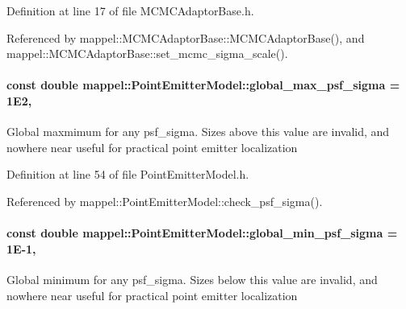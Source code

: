 Definition at line 17 of file M\+C\+M\+C\+Adaptor\+Base.\+h.



Referenced by mappel\+::\+M\+C\+M\+C\+Adaptor\+Base\+::\+M\+C\+M\+C\+Adaptor\+Base(), and mappel\+::\+M\+C\+M\+C\+Adaptor\+Base\+::set\+\_\+mcmc\+\_\+sigma\+\_\+scale().

\paragraph[{\texorpdfstring{global\+\_\+max\+\_\+psf\+\_\+sigma}{global_max_psf_sigma}}]{\setlength{\rightskip}{0pt plus 5cm}const double mappel\+::\+Point\+Emitter\+Model\+::global\+\_\+max\+\_\+psf\+\_\+sigma = 1\+E2\hspace{0.3cm}{\ttfamily [static]}, {\ttfamily [inherited]}}\hypertarget{classmappel_1_1PointEmitterModel_a5e79dba8966c25c4e9c675cd1a2cab70}{}\label{classmappel_1_1PointEmitterModel_a5e79dba8966c25c4e9c675cd1a2cab70}
Global maxmimum for any psf\+\_\+sigma. Sizes above this value are invalid, and nowhere near useful for practical point emitter localization 

Definition at line 54 of file Point\+Emitter\+Model.\+h.



Referenced by mappel\+::\+Point\+Emitter\+Model\+::check\+\_\+psf\+\_\+sigma().

\paragraph[{\texorpdfstring{global\+\_\+min\+\_\+psf\+\_\+sigma}{global_min_psf_sigma}}]{\setlength{\rightskip}{0pt plus 5cm}const double mappel\+::\+Point\+Emitter\+Model\+::global\+\_\+min\+\_\+psf\+\_\+sigma = 1\+E-\/1\hspace{0.3cm}{\ttfamily [static]}, {\ttfamily [inherited]}}\hypertarget{classmappel_1_1PointEmitterModel_a77d0ca98d77cb8b94117ece2a5b182a4}{}\label{classmappel_1_1PointEmitterModel_a77d0ca98d77cb8b94117ece2a5b182a4}
Global minimum for any psf\+\_\+sigma. Sizes below this value are invalid, and nowhere near useful for practical point emitter localization 

